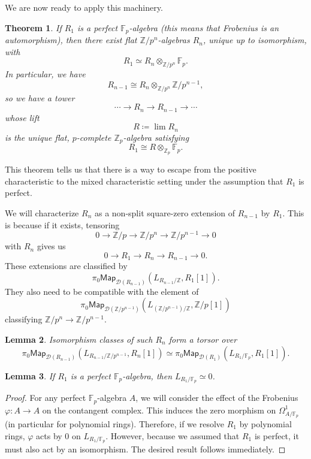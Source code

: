\documentclass[10pt]{amsart}
\newtheorem{thm}{Theorem}[subsection]
\newtheorem{lem}[thm]{Lemma}
\theoremstyle{definition}
\theoremstyle{remark}
\theoremstyle{plain}
\theoremstyle{definition}
\theoremstyle{remark}
\newcommand{\Z}{\mathbb{Z}}
\newcommand{\F}{\mathbb{F}}
\newcommand{\mc}[1]{\mathcal{#1}}
\newcommand{\ms}[1]{\mathsf{#1}}
\newcommand{\1}{\mathbf{1}}
\newcommand{\2}{\mathbf{2}}
\newcommand{\3}{\mathbf{3}}
\begin{document}
We are now ready to apply this machinery.
\begin{thm}\label{thm:wittvectors}
    If $R_1$ is a perfect $\F_p$-algebra (this means that Frobenius is an automorphism), then there exist flat $\Z/p^n$-algebras $R_n$, unique up to isomorphism, with 
    \[ R_1 \simeq R_n \otimes_{\Z/p^n} \F_p. \]
    In particular, we have
    \[ R_{n-1} \cong R_n \otimes_{\Z/p^n} \Z/p^{n-1}, \]
    so we have a tower
    \[ \cdots \to R_n \to R_{n-1} \to \cdots \]
    whose lift
    \[ R \coloneqq \lim R_n \]
    is the unique flat, $p$-complete $\Z_p$-algebra satisfying
    \[ R_1 \cong R \otimes_{\Z_p} \F_p. \]
\end{thm}

This theorem tells us that there is a way to escape from the positive characteristic to the mixed characteristic setting under the assumption that $R_1$ is perfect.

We will characterize $R_n$ as a non-split square-zero extension of $R_{n-1}$ by $R_1$. This is because if it exists, tensoring
\[ 0 \to \Z/p \to \Z/p^n \to \Z/p^{n-1} \to 0 \]
with $R_n$ gives us
\[ 0 \to R_1 \to R_n \to R_{n-1} \to 0. \]
These extensions are classified by
\[ \pi_0 \ms{Map}_{\mc{D}(R_{n-1})} (L_{R_{n-1}/\Z}, R_1 [1]). \]
They also need to be compatible with the element of
\[ \pi_0 \ms{Map}_{\mc{D}(\Z/p^{n-1})}(L_{(\Z/p^{n-1})/\Z}, \Z/p[1]) \]
classifying $\Z/p^n \to \Z/p^{n-1}$.

\begin{lem}
    Isomorphism classes of such $R_n$ form a torsor over
    \[ \pi_0 \ms{Map}_{\mc{D}(R_{n-1})} (L_{R_{n-1}/\Z/p^{n-1}}, R_n[1]) \simeq \pi_0 \ms{Map}_{\mc{D}(R_1)} (L_{R_1/\F_p}, R_1[1]). \]
\end{lem}

\begin{lem}
    If $R_1$ is a perfect $\F_p$-algebra, then $L_{R_1/\F_p} \simeq 0$.
\end{lem}

\begin{proof}
    For any perfect $\F_p$-algebra $A$, we will consider the effect of the Frobenius $\varphi \colon A \to A$ on the contangent complex. This induces the zero morphism on $\Omega^1_{A/\F_p}$ (in particular for polynomial rings). Therefore, if we resolve $R_1$ by polynomial rings, $\varphi$ acts by $0$ on $L_{R_1/\F_p}$. However, because we assumed that $R_1$ is perfect, it must also act by an isomorphism. The desired result follows immediately.
\end{proof}
\end{document}
